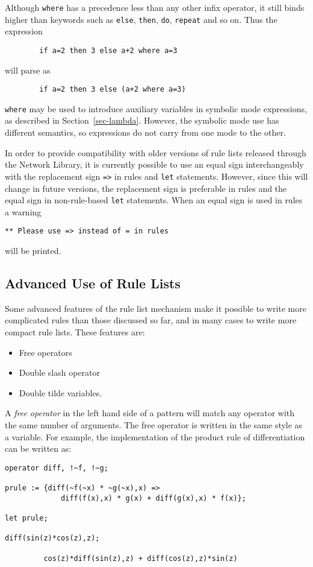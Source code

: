 Although \texttt{where} has a precedence less than any other infix operator,
it still binds higher than keywords such as \texttt{else}, \texttt{then},
\texttt{do}, \texttt{repeat} and so on.  Thus the expression
\begin{verbatim}
        if a=2 then 3 else a+2 where a=3
\end{verbatim}
will parse as
\begin{verbatim}
        if a=2 then 3 else (a+2 where a=3)
\end{verbatim}
\texttt{where} may be used to introduce auxiliary variables in symbolic mode
expressions, as described in Section~\ref{sec-lambda}.  However, the
symbolic mode use has different semantics, so expressions do not carry
from one mode to the other.

\COMPATNOTE In order to provide compatibility with older versions of rule
lists released through the Network Library, it is currently possible to use
an equal sign interchangeably with the replacement sign \texttt{=>} in rules
and \texttt{let} statements.  However, since this will change in future
versions, the replacement sign is preferable in rules and the equal sign
in non-rule-based \texttt{let} statements.
When an equal sign is used in rules a warning
\begin{verbatim}
** Please use => instead of = in rules
\end{verbatim}
will be printed.

\subsection*{Advanced Use of Rule Lists}

Some advanced features of the rule list mechanism make it possible to
write more complicated rules than those discussed so far, and in many
cases to write more compact rule lists.  These features are:

\begin{itemize}
\item Free operators
\item Double slash operator
\item Double tilde variables.
\end{itemize}
A \emph{free operator} in the left hand side of a pattern will match any
operator with the same number of arguments.  The free operator is written
in the same style as a variable.  For example, the implementation of the
product rule of differentiation can be written as:
\begin{verbatim}
operator diff, !~f, !~g;

prule := {diff(~f(~x) * ~g(~x),x) =>
             diff(f(x),x) * g(x) + diff(g(x),x) * f(x)};

let prule;

diff(sin(z)*cos(z),z);

         cos(z)*diff(sin(z),z) + diff(cos(z),z)*sin(z)
\end{verbatim}


